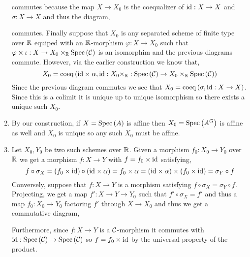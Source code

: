 \documentclass[12pt]{article}
\begin{document}
\begin{enumerate}
\begin{center}
\end{center}
commutes because the map $X \to X_0$ is the coequalizer of $\mathrm{id} : X \to X$ and $\sigma : X \to X$ and thus the diagram,
\begin{center}
\end{center}
commutes. Finally suppose that $X_0$ is any separated scheme of finite type over $\mathbb{R}$ equiped with an $\mathbb{R}$-morphism $\varphi : X \to X_0$ such that $\varphi \times \iota : X \to X_0 \times_{\mathbb{R}} \mathrm{Spec}\left( \mathcal{C} \right)$ is an isomorphim and the previous diagrams commute. However, via the earlier construction  we know that,
\[ X_0 = \operatorname{\mathrm{coeq}}{(\mathrm{id} \times \alpha, \mathrm{id} : X_0 \times_{\mathbb{R}} : \mathrm{Spec}\left( \mathcal{C} \right) \to X_0 \times_{\mathbb{R}} \mathrm{Spec}\left( \mathcal{C} \right))} \]
Since the previous diagram commutes we see that $X_0 = \operatorname{\mathrm{coeq}}{(\sigma, \mathrm{id} : X \to X)}$. Since this is a colimit it is unique up to unique isomorphism so there exists a unique such $X_0$.

\item By our construction, if $X = \mathrm{Spec}\left( A \right)$ is affine then $X_0 = \mathrm{Spec}\left( A^G \right)$ is affine as well and $X_0$ is unique so any such $X_0$ must be affine.

\item Let $X_0, Y_0$ be two such schemes over $\mathbb{R}$. Given a morphism $f_0 : X_0 \to Y_0$ over $\mathbb{R}$ we get a morphism $f : X \to Y$ with $f = f_0 \times \mathrm{id}$ satisfying,
\[ f \circ \sigma_X = (f_0 \times \mathrm{id}) \circ (\mathrm{id} \times \alpha) = f_0 \times \alpha = (\mathrm{id} \times \alpha) \times (f_0 \times \mathrm{id}) = \sigma_Y \circ f \]
Conversely, suppose that $f : X \to Y$ is a morphism satisfying $f \circ \sigma_X = \sigma_Y \circ f$. Projecting, we get a map $f' : X \to Y \to Y_0$ such that $f' \circ \sigma_X = f'$ and thus a map $f_0 : X_0 \to Y_0$ factoring $f'$ through $X \to X_0$ and thus we get a commutative diagram,
\begin{center}
\end{center}
Furthermore, since $f : X \to Y$ is a $\mathcal{C}$-morphism it commutes with $\mathrm{id} : \mathrm{Spec}\left( \mathcal{C} \right) \to \mathrm{Spec}\left( \mathcal{C} \right)$ so $f = f_0 \times \mathrm{id}$ by the universal property of the product.


\end{enumerate}
\end{document}
